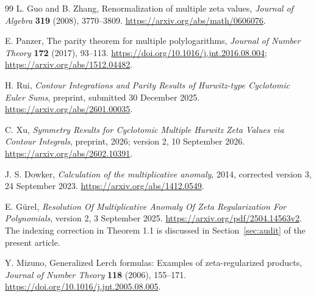 \begin{thebibliography}{99}
L. Guo and B. Zhang, Renormalization of multiple zeta values,
\emph{Journal of Algebra} \textbf{319} (2008), 3770--3809.
\url{https://arxiv.org/abs/math/0606076}.

E. Panzer, The parity theorem for multiple polylogarithms,
\emph{Journal of Number Theory} \textbf{172} (2017), 93--113.
\url{https://doi.org/10.1016/j.jnt.2016.08.004};
\url{https://arxiv.org/abs/1512.04482}.

H. Rui, \emph{Contour Integrations and Parity Results of Hurwitz-type
Cyclotomic Euler Sums}, preprint, submitted 30 December 2025.
\url{https://arxiv.org/abs/2601.00035}.

C. Xu, \emph{Symmetry Results for Cyclotomic Multiple Hurwitz Zeta
Values via Contour Integrals}, preprint, 2026; version 2,
10 September 2026.
\url{https://arxiv.org/abs/2602.10391}.

J. S. Dowker, \emph{Calculation of the multiplicative anomaly},
2014, corrected version 3, 24 September 2023.
\url{https://arxiv.org/abs/1412.0549}.

E. G\"urel, \emph{Resolution Of Multiplicative Anomaly Of Zeta
Regularization For Polynomials}, version 2, 3 September 2025.
\url{https://arxiv.org/pdf/2504.14563v2}.
The indexing correction in Theorem 1.1 is discussed in
Section~\ref{sec:audit} of the present article.

Y. Mizuno, Generalized Lerch formulas: Examples of zeta-regularized
products, \emph{Journal of Number Theory} \textbf{118} (2006), 155--171.
\url{https://doi.org/10.1016/j.jnt.2005.08.005}.

\end{thebibliography}
